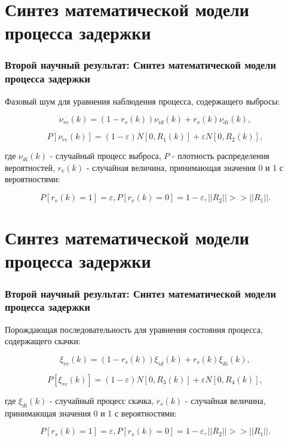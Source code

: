 \documentclass[10pt,pdf,hyperref={unicode}]{beamer}
\begin{document}
\section{Синтез математической модели процесса задержки}
\begin{frame}
\frametitle{Второй научный результат: Синтез математической модели процесса задержки}
Фазовый шум для уравнения наблюдения процесса, содержащего выбросы:


\begin{equation}\label{eq3:v}
\nu_{re}(k)=(1-r_v(k))\nu_{id}(k)+r_v(k)\nu_{di}(k),
\end{equation}

\begin{equation}\label{eq3:vp}
P[\nu_{re}(k)]=(1-\varepsilon)N[0,R_1(k)]+\varepsilon N[0,R_2(k)],
\end{equation}

где $\nu_{di}(k)$ - случайный процесс выброса, $P$ - плотность распределения вероятностей, $r_v(k)$ - случайная величина, принимающая значения 0 и 1 с вероятностями:

\begin{equation}\label{eq3:vpp}
P[r_v(k)=1]=\varepsilon, P[r_v(k)=0]=1-\varepsilon, ||R_2||>>||R_1||.
\end{equation}

\end{frame}


\section{Синтез математической модели процесса задержки}
\begin{frame}
\frametitle{Второй научный результат: Синтез математической модели процесса задержки}
Порождающая последовательность для уравнения состояния процесса, содержащего скачки:

\begin{equation}\label{eq3:s}
\xi_{re}(k)=(1-r_s(k))\xi_{id}(k)+r_s(k)\xi_{di}(k),
\end{equation}

\begin{equation}\label{eq3:sp}
P[\xi_{re}(k)]=(1-\varepsilon)N[0,R_3(k)]+\varepsilon N[0,R_4(k)],
\end{equation}

\noindent где $\xi_{di}(k)$ - случайный процесс скачка, $r_s(k)$ - случайная величина, принимающая значения 0 и 1 с вероятностями:

\begin{equation}\label{eq3:spp}
P[r_s(k)=1]=\varepsilon, P[r_s(k)=0]=1-\varepsilon, ||R_2||>>||R_1||.
\end{equation}

\end{frame}
\end{document}
